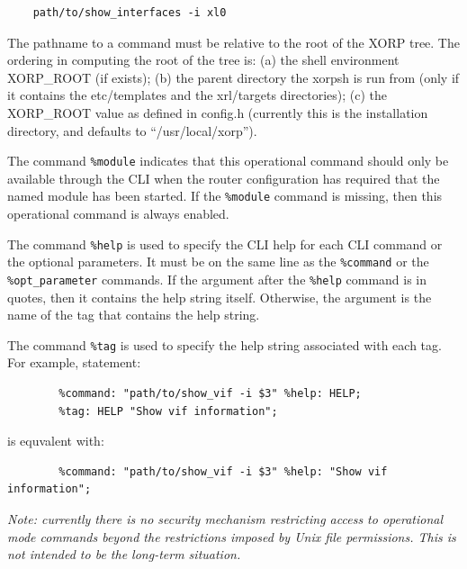 \documentclass[11pt]{article}
\begin{document}
\begin{verbatim}
    path/to/show_interfaces -i xl0
\end{verbatim}

The pathname to a command must be
relative to the root of the XORP tree. The ordering in computing the root of
the tree is: (a) the shell environment XORP\_ROOT (if exists); (b) the parent
directory the xorpsh is run from (only if it contains the
etc/templates and the xrl/targets directories); (c) the XORP\_ROOT value as
defined in config.h (currently this is the installation directory, and
defaults to ``/usr/local/xorp'').

The command {\tt \%module} indicates that this operational command should
only be available through the CLI when the router configuration has required
that the named module has been started.
If the {\tt \%module} command is missing, then this operational command
is always enabled.

The command {\tt \%help} is used to specify the CLI help for each
CLI command or the optional parameters.
It must be on the same line as the {\tt \%command} or the
{\tt \%opt\_parameter} commands. If the argument after the {\tt \%help}
command is in quotes, then it contains the help string itself.
Otherwise, the argument is the name of the tag that contains the help
string.

The command {\tt \%tag} is used to specify the help string associated
with each tag. For example, statement:

\begin{verbatim}
        %command: "path/to/show_vif -i $3" %help: HELP;
        %tag: HELP "Show vif information";
\end{verbatim}

is equvalent with:

\begin{verbatim}
        %command: "path/to/show_vif -i $3" %help: "Show vif information";
\end{verbatim}

\textit{Note: currently there is no security mechanism restricting
access to operational mode commands beyond the restrictions imposed by
Unix file permissions.  This is not intended to be the long-term
situation.}
\end{document}
